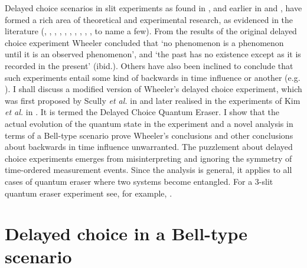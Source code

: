 \documentclass[12pt]{article}
\numberwithin{equation}{section}
\begin{document}
Delayed choice scenarios in slit experiments as found in \cite{wheeler1978past}, and earlier in \cite{von1941deutung} and \cite{bohr1996discussion}, have formed a rich area of theoretical and experimental research, as evidenced in the literature (\cite{eichmann1993young}, \cite{englert2000quantitative},  \cite{doi:10.1119/1.19257}, \cite{doi:10.1119/1.19258}, \cite{Kim1999}, \cite{walborn2002double}, \cite{kwiat2004science}, \cite{aharonov2005time},
\cite{Peres2000}, \cite{Egg2013}, to name a few). 
From the results of the original delayed choice experiment Wheeler concluded that  `no phenomenon is a phenomenon until it is an observed phenomenon', and `the past has
no existence except as it is recorded in the present' (ibid.). Others have also been inclined to conclude that such experiments entail some kind of backwards in time influence or another (e.g. \cite{doi:10.1119/1.19258}). I shall discuss a modified version of Wheeler's delayed choice experiment, which was first proposed by  Scully\textit{ et al.} in \cite{scully1982quantum} and later realised in the experiments of Kim \textit{et al.} in \cite{Kim1999}. It is termed the Delayed Choice Quantum Eraser. I show that the actual evolution of the quantum state in the experiment and a novel analysis in terms of a Bell-type scenario prove Wheeler's conclusions and other conclusions about backwards in time influence  unwarranted. The puzzlement about delayed choice experiments emerges from misinterpreting and ignoring the symmetry of time-ordered measurement events.  Since the analysis is general, it applies to all cases of quantum eraser where two systems become entangled. For a 3-slit quantum eraser experiment see, for example, \cite{shah2017quantum}. 


\section{Delayed choice in a Bell-type scenario}
\label{Bell}
\end{document}
